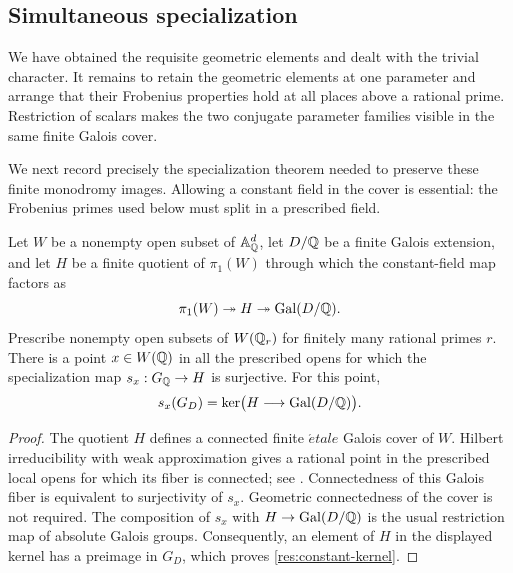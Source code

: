 \subsection{Simultaneous specialization}

We have obtained the requisite geometric elements and dealt with
the trivial character.  It remains to retain the geometric elements
at one parameter and arrange that their Frobenius properties hold
at all places above a rational prime.  Restriction of scalars makes
the two conjugate parameter families visible in the same finite
Galois cover.

We next record precisely the specialization theorem needed to
preserve these finite monodromy images.  Allowing a constant field
in the cover is essential: the Frobenius primes used below must
split in a prescribed field.

\begin{lemma}\label{res:finite-specialization}
Let $W$ be a nonempty open subset of $\mathbb A^d_\mathbb Q$, let $D/\mathbb Q$ be a
finite Galois extension, and let $H$ be a finite quotient of
$\pi_1(W)$ through which the constant-field map factors as
\[
 \pi_1(W)\twoheadrightarrow H\twoheadrightarrow\operatorname{Gal}(D/\mathbb Q).
\]
Prescribe nonempty open subsets of
$W(\mathbb Q_r)$ for finitely many rational primes $r$.
There is a point $x\in W(\mathbb Q)$ in all the prescribed opens for
which the specialization map $s_x:G_\mathbb Q\to H$ is surjective.
For this point,
\begin{equation}\label{res:constant-kernel}
 s_x(G_D)=\ker\bigl(H\longrightarrow\operatorname{Gal}(D/\mathbb Q)\bigr).
\end{equation}
\end{lemma}

\begin{proof}
The quotient $H$ defines a connected finite \(\acute etale\) Galois
cover of $W$.  Hilbert irreducibility with weak approximation gives
a rational point in the prescribed local opens for which its fiber
is connected; see \cite[Proposition~3.3.1 and
Theorem~3.5.3]{SerreHilbert}.  Connectedness of this Galois fiber is
equivalent to surjectivity of $s_x$.  Geometric connectedness of
the cover is not required.  The composition of $s_x$ with
$H\to\operatorname{Gal}(D/\mathbb Q)$ is the usual restriction map of absolute Galois
groups.  Consequently, an element of $H$ in the displayed kernel
has a preimage in $G_D$, which proves
\eqref{res:constant-kernel}.
\end{proof}

